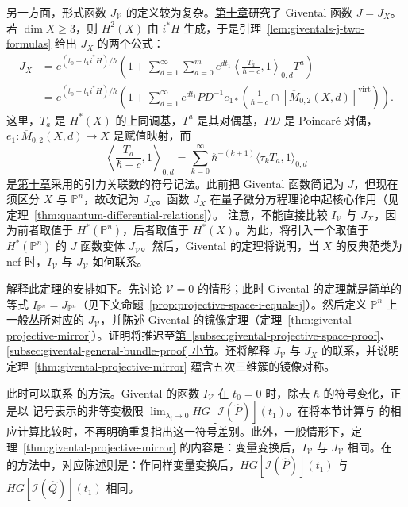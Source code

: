 另一方面，形式函数 $J_{\mathcal V}$ 的定义较为复杂。\hyperref[chap:quantum-differential-equations]{第十章}研究了 Givental 函数 $J=J_X$。若 $\dim X\ge3$，则 $H^2(X)$ 由 $i^*H$ 生成，于是引理~\ref{lem:giventals-j-two-formulas} 给出 $J_X$ 的两个公式：
\begin{equation}\label{eq:complete-intersection-ordinary-j-function}
\begin{aligned}
J_X&=e^{(t_0+t_1i^*H)/\hbar}
\left(1+\sum_{d=1}^{\infty}\sum_{a=0}^m e^{dt_1}
\left\langle\frac{T_a}{\hbar-c},1\right\rangle_{0,d}T^a\right)\\
&=e^{(t_0+t_1i^*H)/\hbar}
\left(1+\sum_{d=1}^{\infty}e^{dt_1}PD^{-1}e_{1*}
\left(\frac1{\hbar-c}\cap[\overline M_{0,2}(X,d)]^{\mathrm{virt}}\right)\right).
\end{aligned}
\end{equation}
这里，$T_a$ 是 $H^*(X)$ 的上同调基，$T^a$ 是其对偶基，$PD$ 是 Poincar\'e 对偶，$e_1:\overline M_{0,2}(X,d)\to X$ 是赋值映射，而
\begin{equation}\label{eq:complete-intersection-symbolic-descendants}
\left\langle\frac{T_a}{\hbar-c},1\right\rangle_{0,d}
=\sum_{k=0}^{\infty}\hbar^{-(k+1)}\langle\tau_kT_a,1\rangle_{0,d}
\end{equation}
是\hyperref[chap:quantum-differential-equations]{第十章}采用的引力关联数的符号记法。此前把 Givental 函数简记为 $J$，但现在须区分 $X$ 与 $\mathbb P^n$，故改记为 $J_X$。函数 $J_X$ 在量子微分方程理论中起核心作用（见定理~\ref{thm:quantum-differential-relations}）。
注意，不能直接比较 $I_{\mathcal V}$ 与 $J_X$，因为前者取值于 $H^*(\mathbb P^n)$，后者取值于 $H^*(X)$。为此，将引入一个取值于 $H^*(\mathbb P^n)$ 的 $J$ 函数变体 $J_{\mathcal V}$。然后，Givental 的定理将说明，当 $X$ 的反典范类为 nef 时，$I_{\mathcal V}$ 与 $J_{\mathcal V}$ 如何联系。

解释此定理的安排如下。先讨论 $\mathcal V=0$ 的情形；此时 Givental 的定理就是简单的等式 $I_{\mathbb P^n}=J_{\mathbb P^n}$（见下文命题~\ref{prop:projective-space-i-equals-j}）。然后定义 $\mathbb P^n$ 上一般丛所对应的 $J_{\mathcal V}$，并陈述 Givental 的镜像定理（定理~\ref{thm:givental-projective-mirror}）。证明将推迟至\hyperref[subsec:givental-projective-space-proof]{第~\ref*{subsec:givental-projective-space-proof}}、\hyperref[subsec:givental-general-bundle-proof]{\ref*{subsec:givental-general-bundle-proof} 小节}。还将解释 $J_{\mathcal V}$ 与 $J_X$ 的联系，并说明定理~\ref{thm:givental-projective-mirror} 蕴含五次三维簇的镜像对称。

此时可以联系  的方法。Givental 的函数 $I_{\mathcal V}$ 在 $t_0=0$ 时，除去 $\hbar$ 的符号变化，正是以  记号表示的非等变极限 $\lim_{\lambda_i\to0}HG[\mathcal I(\widehat P)](t_1)$。在将本节计算与  的相应计算比较时，不再明确重复指出这一符号差别。此外，一般情形下，定理~\ref{thm:givental-projective-mirror} 的内容是：变量变换后，$I_{\mathcal V}$ 与 $J_{\mathcal V}$ 相同。在  的方法中，对应陈述则是：作同样变量变换后，$HG[\mathcal I(\widehat P)](t_1)$ 与 $HG[\mathcal I(\widehat Q)](t_1)$ 相同。

